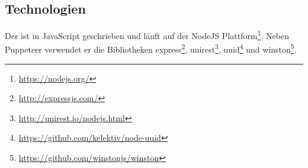 \subsection{Technologien}
    Der {\classificationService} ist in JavaScript geschrieben und läuft auf der
    NodeJS Plattform\footnote{\url{https://nodejs.org/}}.
    Neben Puppeteer verwendet er die Bibliotheken
    express\footnote{\url{http://expressjs.com/}},
    unirest\footnote{\url{http://unirest.io/nodejs.html}},
    uuid\footnote{\url{https://github.com/kelektiv/node-uuid}}
    und winston\footnote{\url{https://github.com/winstonjs/winston}}.